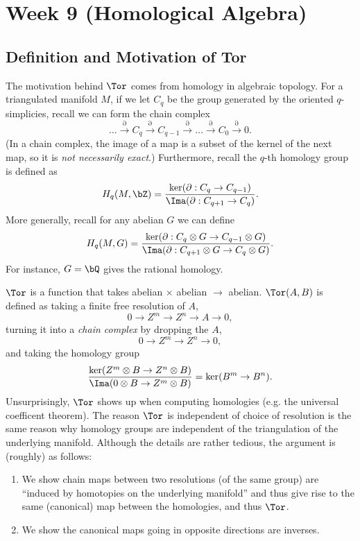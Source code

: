 \section{Week 9 (Homological Algebra)}

\subsection{Definition and Motivation of Tor}
The motivation behind $\Tor$ comes from homology in algebraic topology. For a triangulated manifold $M$, if we let $C_q$ be the group generated by the oriented $q$-simplicies, recall we can form the chain complex
\[
    \dots \xrightarrow{\partial} C_q \xrightarrow{\partial} C_{q-1} \xrightarrow{\partial} \dots \xrightarrow{\partial} C_0 \xrightarrow{\partial} 0.
\]
(In a chain complex, the image of a map is a subset of the kernel of the next map, so it is \textit{not necessarily exact}.) Furthermore, recall the $q$-th homology group is defined as
\[
    H_q(M, \bZ) = \frac{\ker(\partial: C_q \to C_{q-1})}{\Ima(\partial: C_{q+1} \to C_q)}.
\]
More generally, recall for any abelian $G$ we can define
\[
    H_q(M, G) = \frac{\ker(\partial: C_q \otimes G \to C_{q-1} \otimes G)}{\Ima(\partial: C_{q+1} \otimes G \to C_q \otimes G)}.
\]
For instance, $G = \bQ$ gives the rational homology.

$\Tor$ is a function that takes abelian $\times$ abelian $\to$ abelian. $\Tor(A, B)$ is defined as taking a finite free resolution of $A$,
\[
    0 \to Z^m \to Z^n \to A \to 0,
\]
turning it into a \textit{chain complex} by dropping the $A$,
\[
    0 \to Z^m \to Z^n \to 0,
\]
and taking the homology group
\[
    \frac{\ker(Z^m \otimes B \to Z^n \otimes B)}{\Ima(0 \otimes B \to Z^m \otimes B)} = \ker(B^m \to B^n).
\]
Unsurprisingly, $\Tor$ shows up when computing homologies (e.g. the universal coefficent theorem). The reason $\Tor$ is independent of choice of resolution is the same reason why homology groups are independent of the triangulation of the underlying manifold. Although the details are rather tedious, the argument is (roughly) as follows:
\begin{enumerate}
    \item We show chain maps between two resolutions (of the same group) are ``induced by homotopies on the underlying manifold'' and thus give rise to the same (canonical) map between the homologies, and thus $\Tor$.
    \item We show the canonical maps going in opposite directions are inverses.
\end{enumerate}

